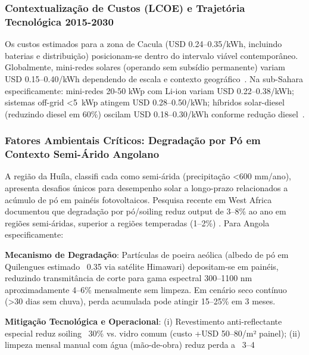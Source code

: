 \documentclass[12pt, a4paper]{article}
\begin{document}
\subsubsection{Contextualização de Custos (LCOE) e Trajetória Tecnológica 2015-2030}

Os custos estimados para a zona de Cacula (USD 0.24--0.35/kWh, incluindo baterias e distribuição) posicionam-se dentro do intervalo viável contemporâneo. Globalmente, mini-redes solares (operando sem subsídio permanente) variam USD 0.15--0.40/kWh dependendo de escala e contexto geográfico~\citep{Ramasamy2022}. Na sub-Sahara especificamente: mini-redes 20-50 kWp com Li-ion variam USD 0.22--0.38/kWh; sistemas off-grid <5~kWp atingem USD 0.28--0.50/kWh; híbridos solar-diesel (reduzindo diesel em 60\%) oscilam USD 0.18--0.30/kWh conforme redução diesel~\citep{IRENA2022}.

\subsubsection{Fatores Ambientais Críticos: Degradação por Pó em Contexto Semi-Árido Angolano}

A região da Huíla, classifi cada como semi-árida (precipitação <600 mm/ano), apresenta desafios únicos para desempenho solar a longo-prazo relacionados a acúmulo de pó em painéis fotovoltaicos. Pesquisa recente em West Africa documentou que degradação por pó/soiling reduz output de 3--8\% ao ano em regiões semi-áridas, superior a regiões temperadas (1--2\%) \citep{Isaacs2025}. Para Angola especificamente:

\textbf{Mecanismo de Degradação}: Partículas de poeira aeólica (albedo de pó em Quilengues estimado ~0.35 via satélite Himawari) depositam-se em painéis, reduzindo transmitância de corte para gama espectral 300--1100 nm aproximadamente 4--6\% mensalmente sem limpeza. Em cenário seco contínuo (>30 dias sem chuva), perda acumulada pode atingir 15--25\% em 3 meses.

\textbf{Mitigação Tecnológica e Operacional}: (i) Revestimento anti-reflectante especial reduz soiling ~30\% vs. vidro comum (custo +USD 50--80/m² painel); (ii) limpeza mensal manual com água (mão-de-obra) reduz perda a ~3--4%
\end{document}
